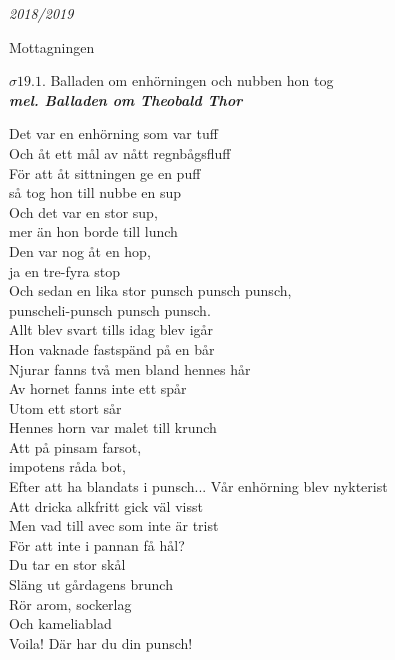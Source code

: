 \documentclass[a6paper,10pt]{article}
\newcommand{\mel}[1]{\small\textbf{\textit{mel. #1 \\}}}
\begin{document}
\begin{center}
\huge \textit{2018/2019}
\end{center}
\begin{center}
\LARGE Mottagningen \\
\end{center}
\begin{center}
\Large $\sigma19.1$. Balladen om enhörningen och nubben hon tog \\
\mel{Balladen om Theobald Thor} 
\end{center}
\small Det var en enhörning som var tuff\\
Och åt ett mål av nått regnbågsfluff\\
För att åt sittningen ge en puff\\
så tog hon till nubbe en sup
\vspace{5pt}\\
Och det var en stor sup,\\
mer än hon borde till lunch\\
Den var nog åt en hop,\\
ja en tre-fyra stop\\
Och sedan en lika stor punsch punsch punsch,\\
punscheli-punsch punsch punsch.
\vspace{5pt}\\
Allt blev svart tills idag blev igår\\
Hon vaknade fastspänd på en bår\\
Njurar fanns två men bland hennes hår\\
Av hornet fanns inte ett spår
\vspace{5pt}\\
Utom ett stort sår\\
Hennes horn var malet till krunch\\
Att på pinsam farsot,\\
impotens råda bot,\\
Efter att ha blandats i punsch...
\newpage
\setlength{\oddsidemargin}{-0.37in}
\noindent
Vår enhörning blev nykterist\\
Att dricka alkfritt gick väl visst\\
Men vad till avec som inte är trist\\
För att inte i pannan få hål?
\vspace{5pt}\\
Du tar en stor skål\\
Släng ut gårdagens brunch\\
Rör arom, sockerlag\\
Och kameliablad\\
Voila! Där har du din punsch!
\end{document}
